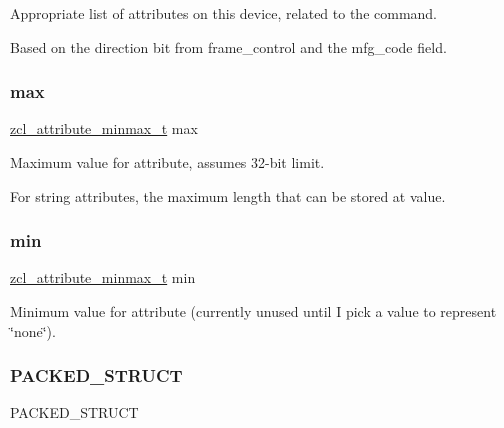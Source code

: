 Appropriate list of attributes on this device, related to the command. 

Based on the {\ttfamily direction} bit from {\ttfamily frame\+\_\+control} and the {\ttfamily mfg\+\_\+code} field. \mbox{\label{group__zcl_gae2490849003f8344782c06334b1e6b17}} 
\subsubsection{\texorpdfstring{max}{max}}
{\footnotesize\ttfamily \hyperlink{unionzcl__attribute__minmax__t}{zcl\+\_\+attribute\+\_\+minmax\+\_\+t} max}



Maximum value for attribute, assumes 32-\/bit limit. 

For string attributes, the maximum length that can be stored at {\ttfamily value}. \mbox{\label{group__zcl_gaad888af9d07cd3b611c75f15f8c90dfe}} 
\subsubsection{\texorpdfstring{min}{min}}
{\footnotesize\ttfamily \hyperlink{unionzcl__attribute__minmax__t}{zcl\+\_\+attribute\+\_\+minmax\+\_\+t} min}



Minimum value for attribute (currently unused until I pick a value to represent \char`\"{}none\char`\"{}). 

\mbox{\label{group__zcl_ga5d86508e715769ce35a4845ed5f8f252}} 
\subsubsection{\texorpdfstring{P\+A\+C\+K\+E\+D\+\_\+\+S\+T\+R\+U\+CT}{PACKED\_STRUCT}\hspace{0.1cm}{\footnotesize\ttfamily [1/3]}}
{\footnotesize\ttfamily P\+A\+C\+K\+E\+D\+\_\+\+S\+T\+R\+U\+CT}

